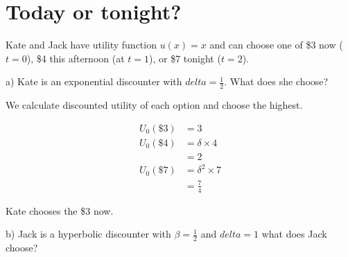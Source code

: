 \documentclass[
  letterpaper,
  DIV=11,
  numbers=noendperiod]{scrreprt}
\begin{document}
\hypertarget{sec-Q3}{%
\section{Today or tonight?}\label{sec-Q3}}

Kate and Jack have utility function \(u(x)=x\) and can choose one of \$3
now (\(t=0\)), \$4 this afternoon (at \(t=1\)), or \$7 tonight
(\(t=2\)).

a) Kate is an exponential discounter with \(delta=\frac{1}{2}\). What
does she choose?

\begin{tcolorbox}[enhanced jigsaw, title=\textcolor{quarto-callout-tip-color}{\faLightbulb}\hspace{0.5em}{Answer}, toprule=.15mm, colback=white, breakable, titlerule=0mm, colframe=quarto-callout-tip-color-frame, coltitle=black, opacityback=0, rightrule=.15mm, colbacktitle=quarto-callout-tip-color!10!white, bottomtitle=1mm, opacitybacktitle=0.6, arc=.35mm, bottomrule=.15mm, toptitle=1mm, leftrule=.75mm, left=2mm]

We calculate discounted utility of each option and choose the highest.

\begin{align*}
U_0(\$3)&=3 \\[6pt]
U_0(\$4)&=\delta\times 4 \\
&=2 \\[6pt]
U_0(\$7)&=\delta^2\times 7 \\
&=\frac{7}{4}
\end{align*}

Kate chooses the \$3 now.

\end{tcolorbox}

b) Jack is a hyperbolic discounter with \(\beta=\frac{1}{2}\) and
\(delta=1\) what does Jack choose?
\end{document}
